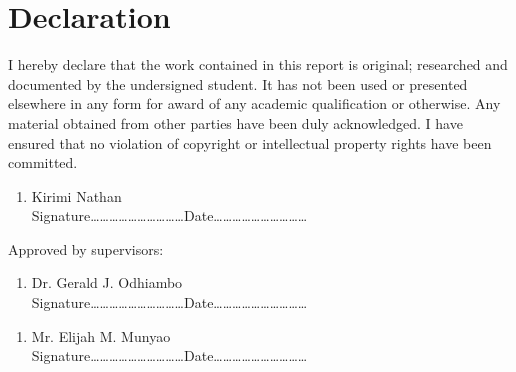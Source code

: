 \section*{Declaration}

I hereby declare that the work contained in this report is original; researched and documented by the undersigned student. It has not been used or presented elsewhere in any form for award of any academic qualification or otherwise. Any material obtained from other parties have been duly acknowledged. I have ensured that no violation of copyright or intellectual property rights have been committed.
\begin{enumerate}

	\item Kirimi Nathan\vspace*{.2cm}\\
	Signature\ldots\ldots\ldots\ldots\ldots\ldots\ldots\ldots\ldots\ldots Date\ldots\ldots\ldots\ldots\ldots\ldots\ldots\ldots\ldots\ldots
\end{enumerate}

\vspace*{.5cm}
Approved by supervisors:
\begin{enumerate}
	\item Dr. Gerald J. Odhiambo\vspace*{.2cm}\\
	Signature\ldots\ldots\ldots\ldots\ldots\ldots\ldots\ldots\ldots\ldots Date\ldots\ldots\ldots\ldots\ldots\ldots\ldots\ldots\ldots\ldots
\end{enumerate}

\begin{enumerate}
	\item Mr. Elijah M. Munyao\vspace*{.2cm}\\
	Signature\ldots\ldots\ldots\ldots\ldots\ldots\ldots\ldots\ldots\ldots Date\ldots\ldots\ldots\ldots\ldots\ldots\ldots\ldots\ldots\ldots
\end{enumerate}


